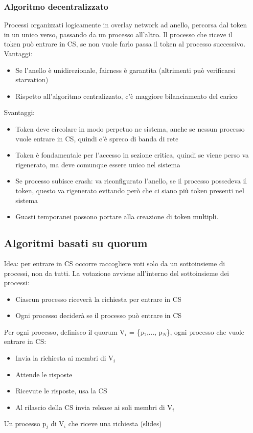 \documentclass[16px]{article}
\begin{document}
\subsubsection{Algoritmo decentralizzato}
Processi organizzati logicamente in overlay network ad anello, percorsa dal token in un unico verso, passando da un processo all'altro. Il processo che riceve il token può entrare in CS, se non vuole farlo passa il token al processo successivo. Vantaggi:
\begin{itemize}
\item Se l'anello è unidirezionale, fairness è garantita (altrimenti può verificarsi starvation)
\item Rispetto all'algoritmo centralizzato, c'è maggiore bilanciamento del carico
\end{itemize}
Svantaggi:
\begin{itemize}
\item Token deve circolare in modo perpetuo ne sistema, anche se nessun processo vuole entrare in CS, quindi c'è spreco di banda di rete
\item Token è fondamentale per l'accesso in sezione critica, quindi se viene perso va rigenerato, ma deve comunque essere unico nel sistema
\item Se processo subisce crash: va riconfigurato l'anello, se il processo possedeva il token, questo va rigenerato evitando però che ci siano più token presenti nel sistema
\item Guasti temporanei possono portare alla creazione di token multipli.
\end{itemize}
\subsection{Algoritmi basati su quorum}
Idea: per entrare in CS occorre raccogliere voti solo da un sottoinsieme di processi, non da tutti. La votazione avviene all'interno del sottoinsieme dei processi:
\begin{itemize}
\item Ciascun processo riceverà la richiesta per entrare in CS
\item Ogni processo deciderà se il processo può entrare in CS
\end{itemize}
Per ogni processo, definisco il quorum V$_i$ = \{p$_1$,..., p$_N$\}, ogni processo che vuole entrare in CS:
\begin{itemize}
\item Invia la richiesta ai membri di V$_i$
\item Attende le risposte
\item Ricevute le risposte, usa la CS
\item Al rilascio della CS  invia release ai soli membri di V$_i$
\end{itemize}
Un processo p$_j$ di V$_i$ che riceve una richiesta (slides)
\end{document}
